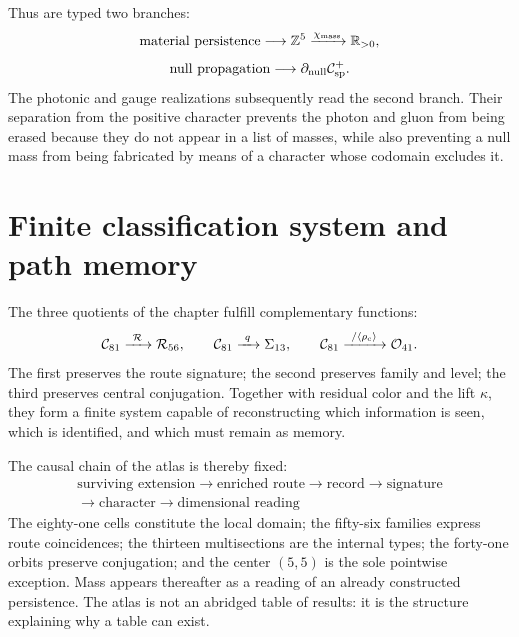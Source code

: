 Thus are typed two branches:
\[
 \text{material persistence}
 \longrightarrow\mathbb Z^5
 \xrightarrow{\chi_{\rm mass}}\mathbb R_{>0},
\]
\[
 \text{null propagation}
 \longrightarrow\partial_{\rm null}\mathcal C_{\rm sp}^{+}.
\]
The photonic and gauge realizations subsequently read the second branch.  Their
separation from the positive character prevents the photon and gluon from being erased because they do not appear
in a list of masses, while also preventing a null mass from being fabricated by means of a
character whose codomain excludes it.

\section{Finite classification system and path memory}

The three quotients of the chapter fulfill complementary functions:
\[
 \mathcal C_{81}
 \xrightarrow{\ \mathcal R\ }\mathcal R_{56},
 \qquad
 \mathcal C_{81}
 \xrightarrow{\ q\ }\Sigma_{13},
 \qquad
 \mathcal C_{81}
 \xrightarrow{\ /\langle\rho_{\rm c}\rangle\ }
 \mathcal O_{41}.
\]
The first preserves the route signature; the second preserves family and level;
the third preserves central conjugation.  Together with residual color and the
lift \(\kappa\), they form a finite system capable of reconstructing
which information is seen, which is identified, and which must remain as
memory.

The causal chain of the atlas is thereby fixed:
\[
 \boxed{
 \begin{gathered}
 \text{surviving extension}
 \longrightarrow\text{enriched route}
 \longrightarrow\text{record}
 \longrightarrow\text{signature}\\
 \longrightarrow\text{character}
 \longrightarrow\text{dimensional reading}
 \end{gathered}}
 \tag{A19}\label{eq:cadena-rectora-atlas-rev6}
\]
The eighty-one cells constitute the local domain; the fifty-six
families express route coincidences; the thirteen multisections are the
internal types; the forty-one orbits preserve conjugation; and the
center \((5,5)\) is the sole pointwise exception. Mass appears thereafter
as a reading of an already constructed persistence. The atlas is not an
abridged table of results: it is the structure explaining why a table can
exist.
